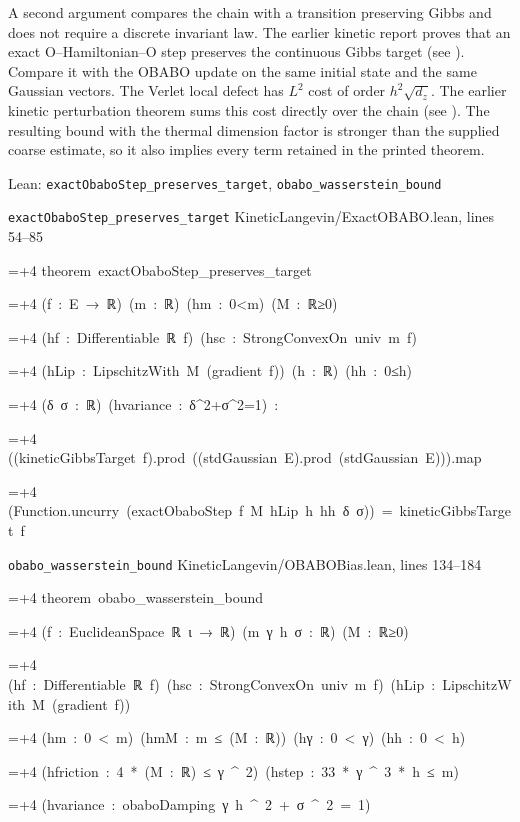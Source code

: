 \documentclass[11pt,a4paper]{report}
\newlength{\leancharwidth}
\newenvironment{leancode}{\par\smallskip\begingroup\ttfamily\footnotesize\raggedright
  \settowidth{\leancharwidth}{M}\setlength{\parskip}{0pt}\setlength{\parindent}{0pt}
  \frenchspacing}{\par\endgroup\smallskip}
\newcommand{\leanline}[2]{\hangindent=\dimexpr#1\leancharwidth+4\leancharwidth\relax
  \hangafter=1\noindent\hspace*{#1\leancharwidth}#2\par}
\newcommand{\leansource}[1]{\par{\footnotesize\color{leanmuted}#1}\par}
\begin{document}
A second argument compares the chain with a transition preserving Gibbs and does not require a discrete invariant law. The earlier kinetic report proves that an exact \(\mathrm O\)–Hamiltonian–\(\mathrm O\) step preserves the continuous Gibbs target (see \cite[Section~3.120.3]{LangevinLean2026Kinetic}). Compare it with the OBABO update on the same initial state and the same Gaussian vectors. The Verlet local defect has \(L^2\) cost of order \(h^2\sqrt{d_z}\). The earlier kinetic perturbation theorem sums this cost directly over the chain (see \cite[Section~3.122.3]{LangevinLean2026Kinetic}). The resulting bound with the thermal dimension factor is stronger than the supplied coarse estimate, so it also implies every term retained in the printed theorem.

\begin{leanbox}{Lean: \texttt{exactObaboStep\_\allowbreak{}preserves\_\allowbreak{}target}, \texttt{obabo\_\allowbreak{}wasserstein\_\allowbreak{}bound}}
\leansource{\texttt{exactObaboStep\_\allowbreak{}preserves\_\allowbreak{}target} \quad KineticLangevin/\allowbreak{}ExactOBABO.lean, lines 54–85}
\begin{leancode}
\leanline{0}{theorem\ exactObaboStep\_preserves\_target}
\leanline{4}{(f\ :\ E\ →\ ℝ)\ (m\ :\ ℝ)\ (hm\ :\ 0<m)\ (M\ :\ ℝ≥0)}
\leanline{4}{(hf\ :\ Differentiable\ ℝ\ f)\ (hsc\ :\ StrongConvexOn\ univ\ m\ f)}
\leanline{4}{(hLip\ :\ LipschitzWith\ M\ (gradient\ f))\ (h\ :\ ℝ)\ (hh\ :\ 0≤h)}
\leanline{4}{(δ\ σ\ :\ ℝ)\ (hvariance\ :\ δ\textasciicircum{}2+σ\textasciicircum{}2=1)\ :}
\leanline{4}{((kineticGibbsTarget\ f).prod\ ((stdGaussian\ E).prod\ (stdGaussian\ E))).map}
\leanline{6}{(Function.uncurry\ (exactObaboStep\ f\ M\ hLip\ h\ hh\ δ\ σ))\ =\ kineticGibbsTarget\ f}
\end{leancode}
\leansource{\texttt{obabo\_\allowbreak{}wasserstein\_\allowbreak{}bound} \quad KineticLangevin/\allowbreak{}OBABOBias.lean, lines 134–184}
\begin{leancode}
\leanline{0}{theorem\ obabo\_wasserstein\_bound}
\leanline{4}{(f\ :\ EuclideanSpace\ ℝ\ ι\ →\ ℝ)\ (m\ γ\ h\ σ\ :\ ℝ)\ (M\ :\ ℝ≥0)}
\leanline{4}{(hf\ :\ Differentiable\ ℝ\ f)\ (hsc\ :\ StrongConvexOn\ univ\ m\ f)\ (hLip\ :\ LipschitzWith\ M\ (gradient\ f))}
\leanline{4}{(hm\ :\ 0\ <\ m)\ (hmM\ :\ m\ ≤\ (M\ :\ ℝ))\ (hγ\ :\ 0\ <\ γ)\ (hh\ :\ 0\ <\ h)}
\leanline{4}{(hfriction\ :\ 4\ *\ (M\ :\ ℝ)\ ≤\ γ\ \textasciicircum{}\ 2)\ (hstep\ :\ 33\ *\ γ\ \textasciicircum{}\ 3\ *\ h\ ≤\ m)}
\leanline{4}{(hvariance\ :\ obaboDamping\ γ\ h\ \textasciicircum{}\ 2\ +\ σ\ \textasciicircum{}\ 2\ =\ 1)}

\end{leancode}
\end{leanbox}
\end{document}
